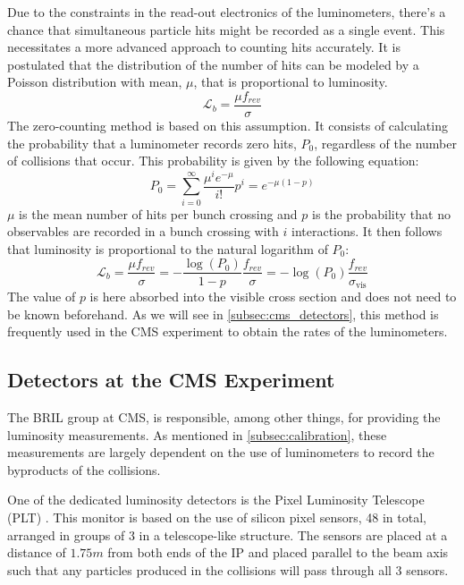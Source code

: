 Due to the constraints in the read-out electronics of the luminometers, there's a chance that simultaneous particle hits might be recorded as a single event. This necessitates a more advanced approach to counting hits accurately. It is postulated that the distribution of the number of hits can be modeled by a Poisson distribution \cite{TheLHCbcollaboration_2014} with mean, $\mu$, that is proportional to luminosity.
\begin{equation}
    \label{eq:luminosity-from-hits}
    \mathcal{L}_b = \frac{\mu f_{rev}}{\sigma}
\end{equation}
The zero-counting method is based on this assumption. It consists of calculating the probability that a luminometer records zero hits, $P_0$, regardless of the number of collisions that occur. This probability is given by the following equation:
\begin{equation}
    \label{eq:zero-counting}
    P_0 = \sum_{i=0}^{\infty} \frac{\mu^i e^{-\mu}}{i!} p^i = e^{-\mu(1-p)}
\end{equation}
$\mu$ is the mean number of hits per bunch crossing and $p$ is the probability that no observables are recorded in a bunch crossing with $i$ interactions. It then follows that luminosity is proportional to the natural logarithm of $P_0$:
\begin{equation}
    \label{eq:luminosity-from-hits-2}
    \mathcal{L}_b = \frac{\mu f_{rev}}{\sigma} = - \frac{\log (P_0)}{1-p} \frac{f_{rev}}{\sigma} = - \log (P_0) \frac{f_{rev}}{\sigma_{\mathrm{vis}}}
\end{equation}
The value of $p$ is here absorbed into the visible cross section \cite{Sirunyan:2759951} and does not need to be known beforehand. As we will see in \autoref{subsec:cms_detectors}, this method is frequently used in the CMS experiment to obtain the rates of the luminometers.

\subsection{Detectors at the CMS Experiment}
\label{subsec:cms_detectors}

The BRIL group at CMS, is responsible, among other things, for providing the luminosity measurements. As mentioned in \autoref{subsec:calibration}, these measurements are largely dependent on the use of luminometers to record the byproducts of the collisions.

One of the dedicated luminosity detectors is the Pixel Luminosity Telescope (PLT) \cite{CMS-DP-2021-020}. This monitor is based on the use of silicon pixel sensors, 48 in total, arranged in groups of 3 in a telescope-like structure. The sensors are placed at a distance of $1.75m$ from both ends of the IP and placed parallel to the beam axis such that any particles produced in the collisions will pass through all 3 sensors.

